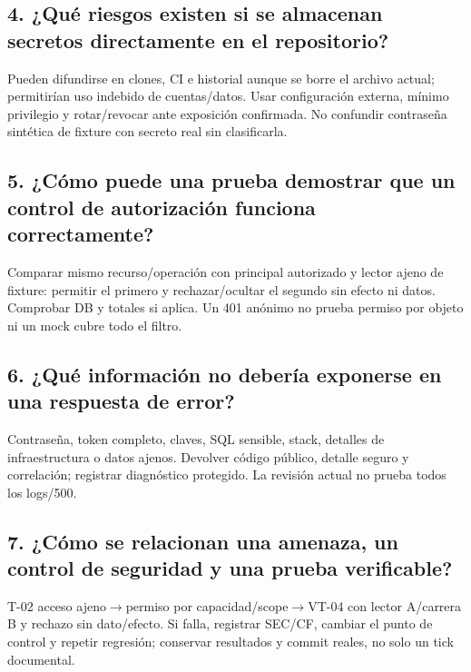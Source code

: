 \documentclass[11pt,a4paper]{article}
\begin{document}
\subsection{4. ¿Qué riesgos existen si se almacenan secretos
directamente en el
repositorio?}\label{APE4-semana-4-4-quuxe9-riesgos-existen-si-se-almacenan-secretos-directamente-en-el-repositorio}

Pueden difundirse en clones, CI e historial aunque se borre el archivo
actual; permitirían uso indebido de cuentas/datos. Usar configuración
externa, mínimo privilegio y rotar/revocar ante exposición confirmada.
No confundir contraseña sintética de fixture con secreto real sin
clasificarla.

\subsection{5. ¿Cómo puede una prueba demostrar que un control de
autorización funciona
correctamente?}\label{APE4-semana-4-5-cuxf3mo-puede-una-prueba-demostrar-que-un-control-de-autorizaciuxf3n-funciona-correctamente}

Comparar mismo recurso/operación con principal autorizado y lector ajeno
de fixture: permitir el primero y rechazar/ocultar el segundo sin efecto
ni datos. Comprobar DB y totales si aplica. Un 401 anónimo no prueba
permiso por objeto ni un mock cubre todo el filtro.

\subsection{6. ¿Qué información no debería exponerse en una respuesta de
error?}\label{APE4-semana-4-6-quuxe9-informaciuxf3n-no-deberuxeda-exponerse-en-una-respuesta-de-error}

Contraseña, token completo, claves, SQL sensible, stack, detalles de
infraestructura o datos ajenos. Devolver código público, detalle seguro
y correlación; registrar diagnóstico protegido. La revisión actual no
prueba todos los logs/500.

\subsection{7. ¿Cómo se relacionan una amenaza, un control de seguridad
y una prueba
verificable?}\label{APE4-semana-4-7-cuxf3mo-se-relacionan-una-amenaza-un-control-de-seguridad-y-una-prueba-verificable}

T-02 acceso ajeno\ensuremath{\rightarrow}permiso por capacidad/scope\ensuremath{\rightarrow}VT-04 con lector A/carrera
B y rechazo sin dato/efecto. Si falla, registrar SEC/CF, cambiar el
punto de control y repetir regresión; conservar resultados y commit
reales, no solo un tick documental.
\end{document}
